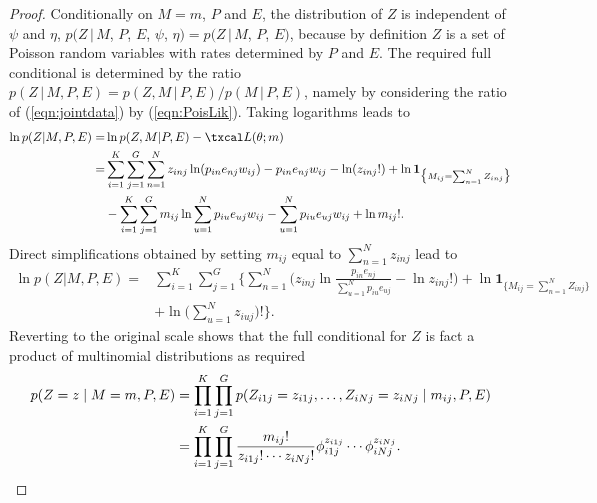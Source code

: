\documentclass[11pt]{amsart}
\theoremstyle{definition}
\theoremstyle{remark}
\begin{document}
\begin{proof} 
Conditionally on $M = m$, $P$ and $E$, the distribution of $Z$ is
independent of $\psi$ and $\eta$, $p(Z\,|\, M$, $P$, $E$, $\psi$, $\eta)
= p(Z\,|\, M$, $P$, $E)$, because by definition $Z$ is a set of
Poisson random variables with rates determined by $P$ and $E$. The
required full conditional is determined by the ratio $p(Z\,|\,M, P, E)
= p(Z,  M\,|\, P,E)/p(M\,|\,P, E)$, namely by considering the ratio 
of (\ref{eqn:jointdata}) by (\ref{eqn:PoisLik}). Taking logarithms
leads to
\begin{align*}
    \ln p(Z|M, P, E) 
  =&
    \ln p(Z, M|P, E) - \txcal L(\theta; m) \\
  =&
    \sum_{i=1}^K \sum_{j=1}^G \sum_{n=1}^N z_{inj}
     \ln(p_{in}e_{nj}w_{ij}) - 
     p_{in}e_{nj}w_{ij} - \ln(z_{inj}!) +\ln \mathbf{1}_{\big\{M_{ij} =
     \sum_{n=1}^N Z_{inj}\big\}} \\ 
    & -\sum_{i=1}^K \sum_{j=1}^G m_{ij}\ln \sum_{u=1}^N
      p_{iu}e_{uj}w_{ij} - 
      \sum_{u=1}^N p_{iu}e_{uj}w_{ij} + \ln m_{ij}!.
\end{align*}
Direct simplifications obtained by  setting $m_{ij}$ equal to
$\sum_{n=1}^N  z_{inj}$ lead to  
\begin{align*}
    \ln p(Z|M, P, E) 
  =&
    \sum_{i=1}^K \sum_{j=1}^G\Big\{
       \sum_{n=1}^N \Big(
           z_{inj} \ln\frac{p_{in}e_{nj}}{\sum_{u=1}^N
           p_{iu}e_{uj}} - \ln z_{inj}!
       \Big) + 
       \ln \mathbf{1}_{\big\{M_{ij} = \sum_{n=1}^N Z_{inj}
     \big\}} \\
     &+ \ln \big(\sum_{u=1}^N z_{iuj}\big)!
   \Big\}.
\end{align*}
Reverting to the original scale shows that the full conditional for
$Z$ is fact a product of multinomial distributions as required
\begin{align}
       p(Z = z\mid M = m, P, E) 
     &= 
       \prod_{i=1}^K \prod_{j=1}^G
       p(Z_{i1j} = z_{i1j}, \ldots, Z_{iNj} =
       z_{iNj}\mid m_{ij}, P, E) \notag\\ 
     &=
       \prod_{i=1}^K \prod_{j=1}^G
       \frac{m_{ij}!}{z_{i1j}!\cdots z_{iNj}!}
        \phi_{i1j}^{z_{i1j}} \cdots
       \phi_{iNj}^{z_{iNj}}. \notag\qedhere
\end{align}
\end{proof}
\end{document}
